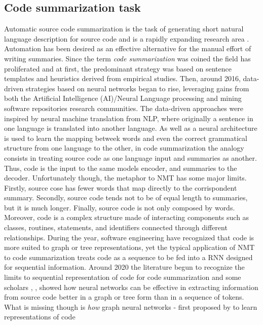 \subsection{Code summarization task}
Automatic source code summarization is the task of generating short natural language description 
for source code and is a rapidly expanding research area \cite{Leclair2020}. 
Automation has been desired as an effective alternative for the manual effort of writing summaries. 
Since the term \textit{code summarization} was coined the field has proliferated and at first, the predominant strategy was based on sentence templates 
and heuristics derived from empirical studies. Then, around 2016, data-driven strategies based on neural networks began to rise, leveraging 
gains from both the Artificial Intelligence (AI)/Neural Language processing and mining 
software repositories research communities. 
The data-driven approaches were inspired by neural machine translation from NLP, where originally a sentence in one language is translated into another language.
As well as a neural architecture is used to learn the mapping betweek words and even the correct grammatical structure from one language to the other, 
in code summarization the analogy consists in treating source code as one language input and summaries as another. Thus, code is the input to the same 
models encoder, and summaries to the decoder. 
Unfortunately though, the metaphor to NMT has some major limits. 
Firstly, source cose has fewer words that map directly to 
the corrispondent summary. Secondly, source code tends not to be of equal length to summaries, but it is much longer.
Finally, source code is not only composed by words. Moreover, code is a complex structure made of interacting components such as
classes, routines, statements, and identifiers connected through different relationships.
During the year, software engineering have recognized that code is more suited to graph or tree representations, yet the typical application of 
NMT to code summarization treats code as a sequence to be fed into a RNN designed for sequential information.
Around 2020 the literature begun to recognize the limits to sequential representation of code 
for code summarization and some scholars \cite{hu2018deep}, \cite{leclair2019neural}, \cite{alon2018code2seq} showed how neural networks can be effective in extracting information from source code 
better in a graph or tree form than in a sequence of tokens. 
What is missing though is \textit{how} graph neural networks - first proposed by \cite{allamanis2018learning} to learn representations of code 
